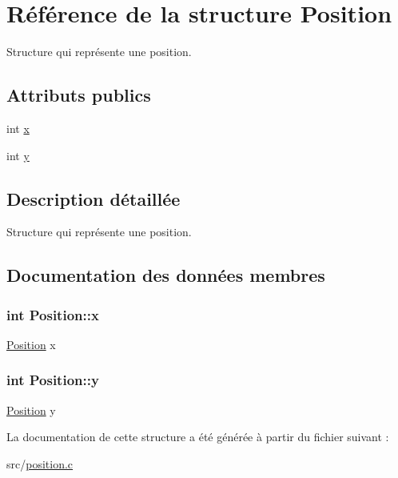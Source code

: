 \hypertarget{structPosition}{\section{\-Référence de la structure \-Position}
\label{structPosition}
}


\-Structure qui représente une position.  


\subsection*{\-Attributs publics}
\begin{DoxyCompactItemize}
\item 
int \hyperlink{structPosition_aeda152ffeee17ae5be9c02327b2408d8}{x}
\item 
int \hyperlink{structPosition_a3c08e9213d4726b21caba3073192c4a3}{y}
\end{DoxyCompactItemize}


\subsection{\-Description détaillée}
\-Structure qui représente une position. 

\subsection{\-Documentation des données membres}
\hypertarget{structPosition_aeda152ffeee17ae5be9c02327b2408d8}{
\subsubsection[{x}]{\setlength{\rightskip}{0pt plus 5cm}int {\bf \-Position\-::x}}}\label{structPosition_aeda152ffeee17ae5be9c02327b2408d8}
\hyperlink{structPosition}{\-Position} x \hypertarget{structPosition_a3c08e9213d4726b21caba3073192c4a3}{
\subsubsection[{y}]{\setlength{\rightskip}{0pt plus 5cm}int {\bf \-Position\-::y}}}\label{structPosition_a3c08e9213d4726b21caba3073192c4a3}
\hyperlink{structPosition}{\-Position} y 

\-La documentation de cette structure a été générée à partir du fichier suivant \-:\begin{DoxyCompactItemize}
\item 
src/\hyperlink{position_8c}{position.\-c}\end{DoxyCompactItemize}
